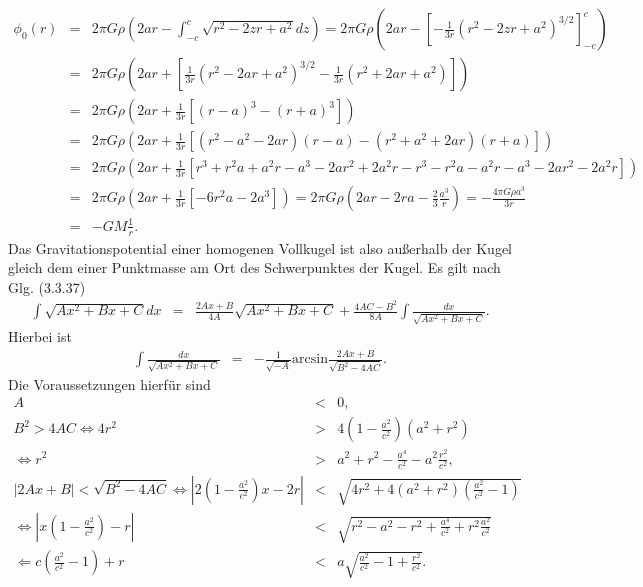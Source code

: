 \documentclass{book}
\renewcommand{\arcsin}{\text{arcsin}}
\begin{document}
\begin{eqnarray}
\phi_0\left(r\right) & = & 2\pi G\rho\left(2ar - \int_{ - c}^{c}\sqrt{r^2 - 2zr + a^2}dz\right) = 2\pi G\rho\left(2ar - \left[-\frac{1}{3r}\left(r^2 - 2zr + a^2\right)^{3/2}\right]_{ - c}^c\right)\nonumber\\
& = & 2\pi G\rho\left(2ar + \left[\frac{1}{3r}\left(r^2 - 2ar + a^2\right)^{3/2} - \frac{1}{3r}\left(r^2 + 2ar + a^2\right)\right]\right)\nonumber\\
& = & 2\pi G\rho\left(2ar + \frac{1}{3r}\left[\left(r - a\right)^{3} - \left(r + a\right)^{3}\right]\right)\nonumber\\
& = & 2\pi G\rho\left(2ar + \frac{1}{3r}\left[\left(r^2 - a^2 - 2ar\right)\left(r - a\right) - \left(r^2 + a^2 + 2ar\right)\left(r + a\right)\right]\right)\nonumber\\
& = & 2\pi G\rho(2ar + \frac{1}{3r}[r^3 + r^2a + a^2r - a^3 - 2ar^2 + 2a^2r - r^3 - r^2a - a^2r - a^3 - 2ar^2 - 2a^2r])\nonumber\\
& = & 2\pi G\rho\left(2ar + \frac{1}{3r}\left[-6r^2a - 2a^3\right]\right) = 2\pi G\rho\left(2ar - 2ra - \frac{2}{3}\frac{a^3}{r}\right) = -\frac{4\pi G\rho a^3}{3r}\nonumber\\
& = & - GM\frac{1}{r}.
\end{eqnarray}
%
Das Gravitationspotential einer homogenen Vollkugel ist also außerhalb der Kugel gleich dem einer Punktmasse am Ort des Schwerpunktes der Kugel. Es gilt nach \cite{abramowitz} Glg. (3.3.37)
%
\begin{eqnarray}
\int\sqrt{Ax^2 + Bx + C}dx & = & \frac{2Ax + B}{4A}\sqrt{Ax^2 + Bx + C} + \frac{4AC - B^2}{8A}\int\frac{dx}{\sqrt{Ax^2 + Bx + C}}.
\end{eqnarray}
%
Hierbei ist
%
\begin{eqnarray}
\int\frac{dx}{\sqrt{Ax^2 + Bx + C}} & = & -\frac{1}{\sqrt{ - A}}\arcsin\frac{2Ax + B}{\sqrt{B^2 - 4AC}}.
\end{eqnarray}
%
Die Voraussetzungen hierfür sind
%
\begin{eqnarray}
A&<&0,\\
B^2>4AC\Leftrightarrow 4r^2&>&4\left(1 - \frac{a^2}{c^2}\right)\left(a^2 + r^2\right)\nonumber\\
\Leftrightarrow r^2&>&a^2 + r^2 - \frac{a^4}{c^2} - a^2\frac{r^2}{c^2}, \nonumber\\
|2Ax + B|<\sqrt{B^2 - 4AC}\Leftrightarrow \left|2\left(1 - \frac{a^2}{c^2}\right)x - 2r\right|&<&\sqrt{4r^2 + 4\left(a^2 + r^2\right)\left(\frac{a^2}{c^2} - 1\right)}\nonumber\\
\Leftrightarrow \left|x\left(1 - \frac{a^2}{c^2}\right) - r\right|&<&\sqrt{r^2 - a^2 - r^2 + \frac{a^4}{c^2} + r^2\frac{a^2}{c^2}}\nonumber\\
\Leftarrow c\left(\frac{a^2}{c^2} - 1\right) + r&<&a\sqrt{\frac{a^2}{c^2} - 1 + \frac{r^2}{c^2}}.\label{eq:ungl_schwere}
\end{eqnarray}
\end{document}
